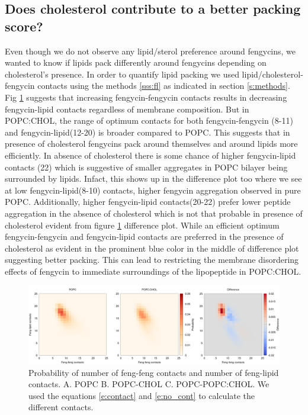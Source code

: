 \subsection{Does cholesterol contribute to a better packing score?}
\label{ss:fl_packing}
Even though we do not observe any lipid/sterol preference around fengycins,
we wanted to know if lipids pack differently around fengycins depending on cholesterol's presence. In order to quantify lipid packing we used lipid/cholesterol-fengycin contacts 
using the methods \ref{sss:fl} as indicated in section \ref{s:methods}.
Fig \ref{f:ff_fl} suggests that increasing fengycin-fengycin contacts results in decreasing
fengycin-lipid contacts regardless of membrane composition. 
But in POPC:CHOL, the range of optimum contacts for both fengycin-fengycin (8-11) and 
fengycin-lipid(12-20) is broader compared to POPC. This suggests that in presence of cholesterol fengycins pack around themselves and around lipids more efficiently.
In absence of cholesterol there is some chance of higher fengycin-lipid 
contacts (22) which is suggestive of smaller aggregates in POPC bilayer being surrounded by lipids. Infact, this shows up in the difference 
plot too where we see at low fengycin-lipid(8-10) contacts, higher fengycin 
aggregation observed in pure POPC. Additionally, higher fengycin-lipid contacts(20-22) prefer lower peptide aggregation in the absence of cholesterol which is not that probable in presence of cholesterol evident from figure \ref{f:ff_fl} difference plot. While an efficient optimum fengycin-fengycin and fengycin-lipid contacts are preferred in the presence of cholesterol as evident in the prominent blue color in the middle of difference plot suggesting better packing. This can lead to restricting the membrane disordering effects of fengycin to immediate surroundings of the lipopeptide in POPC:CHOL. 
\begin{figure}[h!]
\centering
\includegraphics[width=6in,angle=0,keepaspectratio]{chapter3_figs/ff_fl_comb.png}
\caption{Probability of number of feng-feng contacts and number of feng-lipid contacts. 
A. POPC B. POPC-CHOL C. POPC-POPC:CHOL. We used the equations \ref{e:contact} and \ref{e:no_cont} to calculate the different contacts.}
\label{f:ff_fl}
\end{figure}

